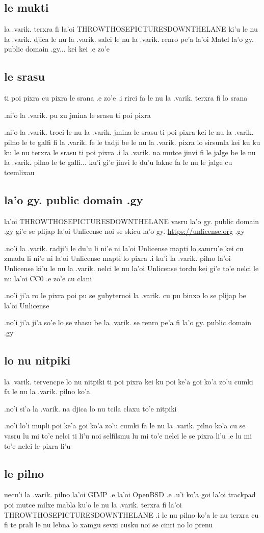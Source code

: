 \documentclass{report}
\begin{document}
\subsection{le mukti}
la .varik. terxra fi la'oi THROWTHOSEPICTURESDOWNTHELANE ki'u le nu la .varik. djica le nu la .varik. salci le nu la .varik. renro pe'a la'oi Matel la'o gy. public domain .gy... kei kei .e zo'e

\subsection{le srasu}
ti poi pixra cu pixra le srana .e zo'e  .i rirci fa le nu la .varik. terxra fi lo srana

.ni'o la .varik. pu zu jmina le srasu ti poi pixra

.ni'o la .varik. troci le nu la .varik. jmina le srasu ti poi pixra kei le nu la .varik. pilno le te galfi fi la .varik. fe le tadji be le nu la .varik. pixra lo sirsunla kei ku ku ku le nu terxra le srasu ti poi pixra  .i la .varik. na mutce jinvi fi le jalge be le nu la .varik. pilno le te galfi... ku'i gi'e jinvi le du'u lakne fa le nu le jalge cu tcemlixau

\subsection{la'o gy. public domain .gy}
la'oi THROWTHOSEPICTURESDOWNTHELANE vasru la'o gy. public domain .gy gi'e se plijap la'oi Unlicense noi se skicu la'o gy. \url{https://unlicense.org} .gy

.no'i la .varik. radji'i le du'u li ni'e ni la'oi Unlicense mapti lo samru'e kei cu zmadu li ni'e ni la'oi Unlicense mapti lo pixra  .i ku'i la .varik. pilno la'oi Unlicense ki'u le nu la .varik. nelci le nu la'oi Unlicense tordu kei gi'e to'e nelci le nu la'oi CC0 .e zo'e cu clani

.no'i ji'a ro le pixra poi pu se gubyternoi la .varik. cu pu binxo lo se plijap be la'oi Unlicense

.no'i ji'a ji'a so'e lo se zbasu be la .varik. se renro pe'a fi la'o gy. public domain .gy

\subsection{lo nu nitpiki}
la .varik. tervencpe lo nu nitpiki ti poi pixra kei ku poi ke'a goi ko'a zo'u cumki fa le nu la .varik. pilno ko'a

.no'i si'a la .varik. na djica lo nu tcila claxu to'e nitpiki

.no'i lo'i mupli poi ke'a goi ko'a zo'u cumki fa le nu la .varik. pilno ko'a cu se vasru lu mi to'e nelci ti li'u noi selfilsmu lu mi to'e nelci le se pixra li'u .e lu mi to'e nelci le pixra li'u

\subsection{le pilno}
uecu'i la .varik. pilno la'oi GIMP .e la'oi OpenBSD .e .u'i ko'a goi la'oi trackpad poi mutce milxe mabla ku'o le nu la .varik. terxra fi la'oi THROWTHOSEPICTURESDOWNTHELANE  .i le nu pilno ko'a le nu terxra cu fi te prali le nu lebna lo xamgu sevzi cusku noi se cinri no lo prenu
\end{document}
